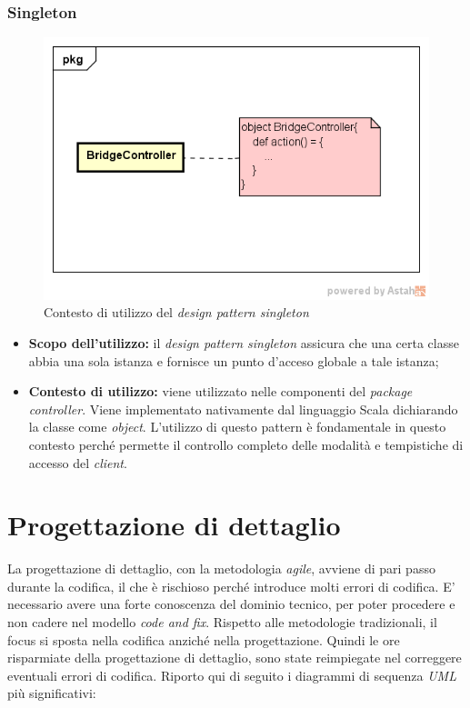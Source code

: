 \subsubsection{Singleton}
\begin{figure}[h]
\centering
\includegraphics[scale=0.50]{immagini/singleton}
\caption{Contesto di utilizzo del \emph{design pattern singleton}}
\label{fig:pattern-singleton}
\end{figure}
\begin{itemize}
\item\textbf{Scopo dell'utilizzo:} il \emph{design pattern singleton} assicura che una certa classe abbia una sola istanza e fornisce un punto d'acceso globale a tale istanza;
\item \textbf{Contesto di utilizzo:} viene utilizzato nelle componenti del \emph{package controller}. Viene implementato nativamente dal linguaggio Scala dichiarando la classe come \emph{object}. L'utilizzo di questo pattern è fondamentale in questo contesto perché permette il controllo completo delle modalità e tempistiche di accesso del \emph{client}.
\end{itemize}



\newpage
\section{Progettazione di dettaglio}
La progettazione di dettaglio, con la metodologia \emph{agile}, avviene di pari passo durante la codifica, il che è rischioso perché introduce molti errori di codifica. E' necessario avere una forte conoscenza del dominio tecnico, per poter procedere e non cadere nel modello \emph{code and fix}. Rispetto alle metodologie tradizionali, il focus si sposta nella codifica anziché nella progettazione. Quindi le ore risparmiate della progettazione di dettaglio, sono state reimpiegate nel correggere eventuali errori di codifica. Riporto qui di seguito i diagrammi di sequenza \emph{UML} più significativi:
